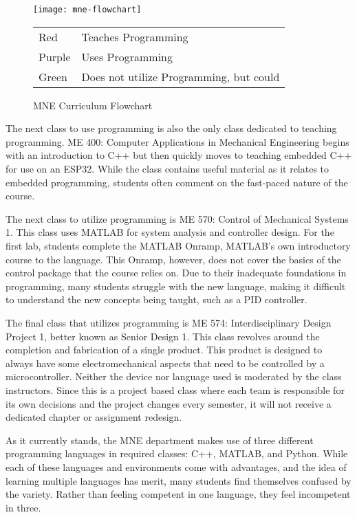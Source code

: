 \begin{figure}[!htbp]
    \texttt{[image: mne-flowchart]}
    \begin{tabular}{l@{ : }l}
        Red & Teaches Programming \\
        Purple & Uses Programming \\
        Green & Does not utilize Programming, but could \\
    \end{tabular}
    \centering
    \caption{MNE Curriculum Flowchart}
    \centering
    \label{fig:mne_flowchart}
\end{figure}

The next class to use programming is also the only class dedicated to teaching programming.
ME 400: Computer Applications in Mechanical Engineering begins with an introduction to C++
but then quickly moves to teaching embedded C++ for use on an ESP32. While the class
contains useful material as it relates to embedded programming, students often comment on
the fast-paced nature of the course.

The next class to utilize programming is ME 570: Control of Mechanical Systems 1. This class
uses MATLAB for system analysis and controller design. For the first lab, students complete the
MATLAB Onramp, MATLAB's own introductory course to the language. This Onramp, however, does
not cover the basics of the control package that the course relies on. Due to their inadequate 
foundations in programming, many students struggle with the new language, making it difficult 
to understand the new concepts being taught, such as a PID controller.

The final class that utilizes programming is ME 574: Interdisciplinary Design Project 1, 
better known as Senior Design 1. This class revolves around the completion and fabrication
of a single product. This product is designed to always have some electromechanical aspects that need to
be controlled by a microcontroller. Neither the device nor language used is moderated by
the class instructors. Since this is a project based class where each team is responsible
for its own decisions and the project changes every semester, it will not receive a dedicated
chapter or assignment redesign.

As it currently stands, the MNE department makes use of three different programming languages
in required classes: C++, MATLAB, and Python. While each of these languages and 
environments come with advantages, and the idea of learning multiple languages has merit,
many students find themselves confused by the variety. Rather than
feeling competent in one language, they feel incompetent in three.

